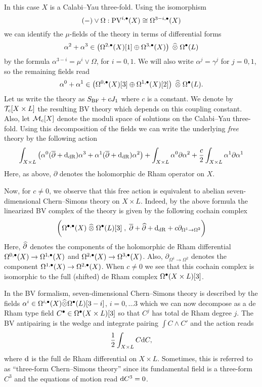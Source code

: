 \documentclass[11pt]{amsart}
\def\PV{{\rm PV}}
\begin{document}
In this case $X$ is a Calabi--Yau three-fold.
Using the isomorphism
\[
 (-) \vee \Omega : \PV^{i,\bu} (X) \cong \Omega^{3-i, \bu}(X)
\]
we can identify the $\mu$-fields of the theory in terms of differential forms
\[
  \alpha^2 + \alpha^3 \in \left(\Omega^{2,\bu}(X)[1] \oplus \Omega^{3,\bu}(X)\right) \; \Hat{\otimes} \; \Omega^\bu(L)
\]
by the formula $\alpha^{3-i} = \mu^{i} \vee \Omega$, for $i=0,1$.
We will also write $\alpha^{j} = \gamma^{j}$ for $j=0,1$, so the remaining fields read
\[
  \alpha^0 + \alpha^1 \in \left(\Omega^{0,\bu}(X)[3] \oplus \Omega^{1,\bu}(X)[2] \right) \; \Hat{\otimes} \; \Omega^\bu (L).
\]
Let us write the theory as $S_{\rm BF} + c J_1$ where $c$ is a constant.
We denote by $\cT_c [X \times L]$ the resulting BV theory which depends on this coupling constant.
Also, let $\cM_c[X]$ denote the moduli space of solutions on the Calabi--Yau three-fold.
Using this decomposition of the fields we can write the underlying {\em free} theory by the following action
\[
  \int_{X\times L} \left(\alpha^0 (\dbar + \d_{\rm dR}) \alpha^3 + \alpha^1 (\dbar + \d_{\rm dR}) \alpha^2 \right) + \int_{X \times L} \alpha^0 \partial \alpha^2 + \frac{c}{2} \int_{X \times L} \alpha^1 \partial \alpha^1
\]
Here, as above, $\partial$ denotes the holomorphic de Rham operator on $X$.

Now, for $c \ne 0$, we observe that this free action is equivalent to abelian seven-dimensional Chern--Simons theory on $X \times L$.
Indeed, by the above formula the linearized BV complex of the theory is given by the following cochain complex
\[
  \bigg(\Omega^{\bu, \bu} (X) \; \Hat{\otimes} \; \Omega^{\bu}(L) [3] \; , \; \dbar + \Hat{\partial} + \d_{\rm dR} + c \partial_{\Omega^{1} \to \Omega^{2}} \bigg)
\]
Here, $\Hat{\partial}$ denotes the components of the holomorphic de Rham differential $\Omega^{0,\bu}(X) \to \Omega^{1,\bu}(X)$ and $\Omega^{2,\bu}(X) \to \Omega^{3,\bu}(X)$.
Also, $\partial_{\Omega^1 \to \Omega^2}$ denotes the component $\Omega^{1,\bu}(X) \to \Omega^{2,\bu}(X)$.
When $c \ne 0$ we see that this cochain complex is isomorphic to the full (shifted) de Rham complex $\Omega^\bu(X \times L)[3]$.

In the BV formalism, seven-dimensional Chern--Simons theory is described by the fields $\alpha^i \in \Omega^{i,\bu}(X) \Hat{\otimes} \Omega^\bu(L)[3-i]$, $i=0, \ldots 3$ which we can now decompose as a de Rham type field $C^\bu \in \Omega^\bu(X \times L)[3]$ so that $C^j$ has total de Rham degree $j$.
The BV antipairing is the wedge and integrate pairing $\int C \wedge C'$ and the action reads
\[
  \frac{1}{2} \int_{X \times L} C \d C,
\]
where $\d$ is the full de Rham differential on $X \times L$.
Sometimes, this is referred to as ``three-form Chern--Simons theory'' since its fundamental field is a three-form $C^3$ and the equations of motion read $\d C^3 = 0$.
\end{document}
